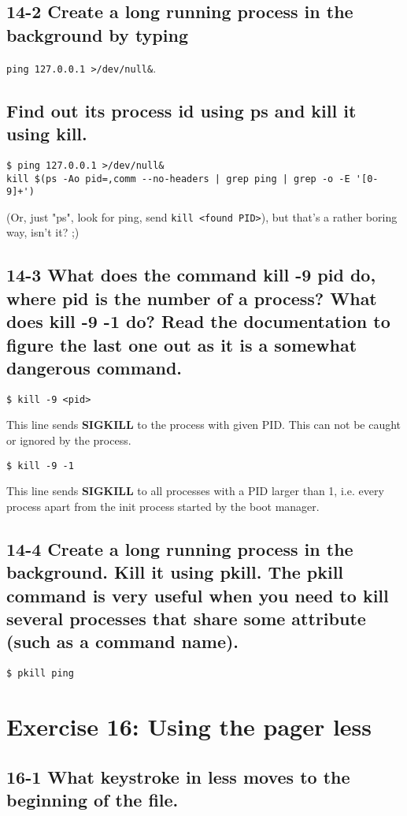 \subsection{14-2 Create a long running process in the background by typing} \verb=ping 127.0.0.1 >/dev/null&=.
\subsection{Find out its process id using ps and kill it using kill.}
\begin{verbatim}
$ ping 127.0.0.1 >/dev/null&
kill $(ps -Ao pid=,comm --no-headers | grep ping | grep -o -E '[0-9]+')
\end{verbatim}

(Or, just "ps", look for ping, send \verb=kill <found PID>=), but that's a rather boring way, isn't it? ;)

\subsection{14-3 What does the command kill -9 pid do, where pid is the number of a process? What does kill -9 -1 do? Read the documentation to figure the last one out as it is a somewhat dangerous command.}
\verb=$ kill -9 <pid>=

This line sends \textbf{SIGKILL} to the process with given PID. This can not be caught or ignored by the process.

\verb=$ kill -9 -1=

This line sends \textbf{SIGKILL} to all processes with a PID larger than 1, i.e. every process apart from the init process started by the boot manager.


\subsection{14-4 Create a long running process in the background. Kill it using pkill. The pkill command is very useful when you need to kill several processes that share some attribute (such as a command name).}
\verb=$ pkill ping=


\section{Exercise 16: Using the pager less}
\subsection{16-1 What keystroke in less moves to the beginning of the file.}
